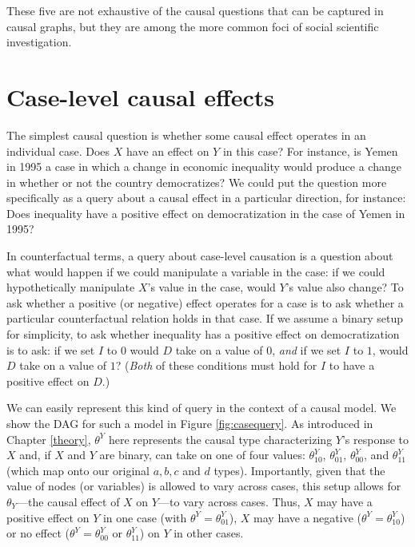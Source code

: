 \documentclass[
  12pt,
]{book}
\begin{document}
These five are not exhaustive of the causal questions that can be captured in causal graphs, but they are among the more common foci of social scientific investigation.

\hypertarget{case-level-causal-effects}{%
\section{Case-level causal effects}\label{case-level-causal-effects}}

The simplest causal question is whether some causal effect operates in an individual case. Does \(X\) have an effect on \(Y\) in this case? For instance, is Yemen in 1995 a case in which a change in economic inequality would produce a change in whether or not the country democratizes? We could put the question more specifically as a query about a causal effect in a particular direction, for instance: Does inequality have a positive effect on democratization in the case of Yemen in 1995?

In counterfactual terms, a query about case-level causation is a question about what would happen if we could manipulate a variable in the case: if we could hypothetically manipulate \(X\)'s value in the case, would \(Y\)'s value also change? To ask whether a positive (or negative) effect operates for a case is to ask whether a particular counterfactual relation holds in that case. If we assume a binary setup for simplicity, to ask whether inequality has a positive effect on democratization is to ask: if we set \(I\) to \(0\) would \(D\) take on a value of \(0\), \emph{and} if we set \(I\) to \(1\), would \(D\) take on a value of \(1\)? (\emph{Both} of these conditions must hold for \(I\) to have a positive effect on \(D\).)

We can easily represent this kind of query in the context of a causal model. We show the DAG for such a model in Figure \ref{fig:casequery}. As introduced in Chapter \ref{theory}, \(\theta^Y\) here represents the causal type characterizing \(Y\)'s response to \(X\) and, if \(X\) and \(Y\) are binary, can take on one of four values: \(\theta^Y_{10}\), \(\theta^Y_{01}\), \(\theta^Y_{00}\), and \(\theta^Y_{11}\) (which map onto our original \(a, b, c\) and \(d\) types). Importantly, given that the value of nodes (or variables) is allowed to vary across cases, this setup allows for \(\theta_Y\)---the causal effect of \(X\) on \(Y\)---to vary across cases. Thus, \(X\) may have a positive effect on \(Y\) in one case (with \(\theta^Y=\theta^Y_{01}\)), \(X\) may have a negative (\(\theta^Y=\theta^Y_{10}\)) or no effect (\(\theta^Y=\theta^Y_{00}\) or \(\theta^Y_{11}\)) on \(Y\) in other cases.
\end{document}

